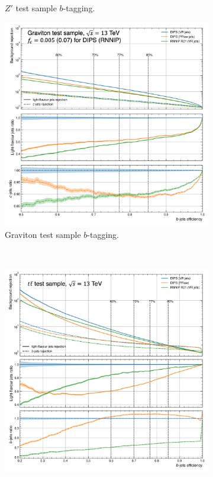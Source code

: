 \begin{figure}
\begin{subfigure}[t]{0.3\textwidth}
    \caption{$Z'$ test sample $b$-tagging.}
    \label{fig:dipsVRROCzp}
  \end{subfigure}
  \hfill
  \begin{subfigure}[t]{0.3\textwidth}
    \centering
    \includegraphics[scale=0.43]{Images/FTAG/VRDips/ROC/grb.png}
    \caption{Graviton test sample $b$-tagging.}
    \label{fig:dipsVRROCgr}
  \end{subfigure} \\
  \begin{subfigure}[t]{0.3\textwidth}
    \centering
    \includegraphics[scale=0.43]{Images/FTAG/VRDips/ROC/ttc.png}

\end{subfigure}
\end{figure}
